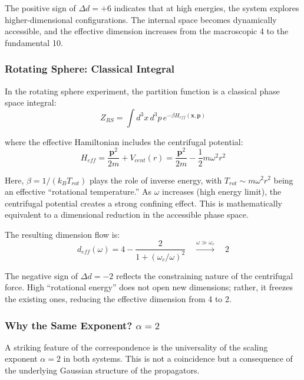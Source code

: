 \documentclass[12pt,a4paper]{article}
\begin{document}
The positive sign of $\Delta d = +6$ indicates that at high energies, the system explores higher-dimensional configurations. The internal space becomes dynamically accessible, and the effective dimension increases from the macroscopic 4 to the fundamental 10.

\subsubsection{Rotating Sphere: Classical Integral}

In the rotating sphere experiment, the partition function is a classical phase space integral:
\begin{equation}
    Z_{RS} = \int d^3x \, d^3p \, e^{-\beta H_{eff}(\mathbf{x}, \mathbf{p})}
\end{equation}

where the effective Hamiltonian includes the centrifugal potential:
\begin{equation}
    H_{eff} = \frac{\mathbf{p}^2}{2m} + V_{cent}(r) = \frac{\mathbf{p}^2}{2m} - \frac{1}{2}m\omega^2 r^2
\end{equation}

Here, $\beta = 1/(k_B T_{rot})$ plays the role of inverse energy, with $T_{rot} \sim m\omega^2 r^2$ being an effective ``rotational temperature.'' As $\omega$ increases (high energy limit), the centrifugal potential creates a strong confining effect. This is mathematically equivalent to a dimensional reduction in the accessible phase space.

The resulting dimension flow is:
\begin{equation}
    d_{eff}(\omega) = 4 - \frac{2}{1+(\omega_c/\omega)^2} \quad \xrightarrow{\omega \gg \omega_c} \quad 2
\end{equation}

The negative sign of $\Delta d = -2$ reflects the constraining nature of the centrifugal force. High ``rotational energy'' does not open new dimensions; rather, it freezes the existing ones, reducing the effective dimension from 4 to 2.

\subsubsection{Why the Same Exponent? $\alpha = 2$}

A striking feature of the correspondence is the universality of the scaling exponent $\alpha = 2$ in both systems. This is not a coincidence but a consequence of the underlying Gaussian structure of the propagators.
\end{document}
